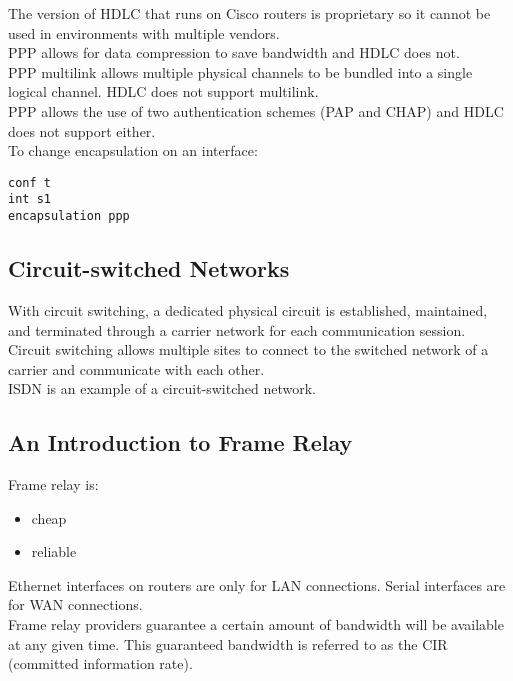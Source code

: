 The version of HDLC that runs on Cisco routers is proprietary so it cannot
be used in environments with multiple vendors.\\

PPP allows for data compression to save bandwidth and HDLC does not.\\

PPP multilink allows multiple physical channels to be bundled into a single
logical channel. HDLC does not support multilink.\\

PPP allows the use of two authentication schemes (PAP and CHAP) and HDLC
does not support either.\\

To change encapsulation on an interface:

\begin{verbatim}
conf t
int s1
encapsulation ppp
\end{verbatim}

\subsection{Circuit-switched Networks}

With circuit switching, a dedicated physical circuit is established, maintained,
and terminated through a carrier network for each communication session.\\

Circuit switching allows multiple sites to connect to the switched network of a
carrier and communicate with each other.\\

ISDN is an example of a circuit-switched network.

\subsection{An Introduction to Frame Relay}

Frame relay is:

\begin{itemize}
\item cheap
\item reliable
\end{itemize}

Ethernet interfaces on routers are only for LAN connections. Serial interfaces
are for WAN connections.\\

Frame relay providers guarantee a certain amount of bandwidth will be
available at any given time. This guaranteed bandwidth is referred to as
the CIR (committed information rate).\\

